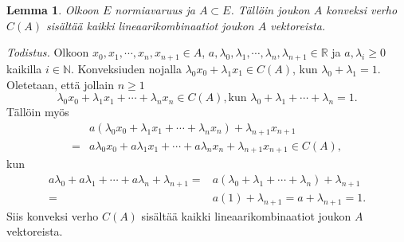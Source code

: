 \documentclass[12pt,a4paper,reqno]{amsart}
\newcommand{\R}{\mathbb{R}}
\newcommand{\N}{\mathbb{N}}
\newtheorem{lemma}[maar]{Lemma}
\begin{document}
\begin{lemma} \emph{Olkoon $E$ normiavaruus ja $A\subset E$. Tällöin joukon $A$ konveksi verho $C(A)$ sisältää kaikki lineaarikombinaatiot joukon $A$ vektoreista. }
\end{lemma}

\emph{Todistus.} 
Olkoon $x_0,x_1,\cdots, x_n, x_{n+1} \in A$, $a,\lambda_0,\lambda_1,\cdots, \lambda_n, \lambda_{n+1} \in \R$ ja $a,\lambda_i\geq 0$ kaikilla $ i\in\N$. Konveksiuden nojalla 
$\lambda_0 x_0+\lambda_1 x_1 \in C(A)$, kun $\lambda_0 +\lambda_1=1$.
Oletetaan, että jollain $n\geq 1$ 
\begin{equation*}
\lambda_0 x_0+\lambda_1 x_1+\cdots+\lambda_{n} x_{n}\in C(A), \text{kun } \lambda_0+\lambda_1+\cdots+ \lambda_{n} =1.
 \end{equation*}
Tällöin myös
\begin{equation*}
\begin{split}
&a(\lambda_0 x_0+\lambda_1 x_1+\cdots+\lambda_{n}x_n)+\lambda_{n+1} x_{n+1}\\=&a\lambda_0 x_0+a\lambda_1 x_1+\cdots+a\lambda_{n}x_n+\lambda_{n+1} x_{n+1}
\in C(A),
\end{split}
\end{equation*}
kun 
\begin{equation*}
\begin{split}
a\lambda_0+a\lambda_1+\cdots+ a\lambda_{n}+ \lambda_{n+1}=&a(\lambda_0+\lambda_1+\cdots+ \lambda_{n})+ \lambda_{n+1}\\=&a(1)+ \lambda_{n+1}=a+ \lambda_{n+1}=1.
\end{split}
\end{equation*} 
Siis konveksi verho $C(A)$ sisältää kaikki lineaarikombinaatiot joukon $A$ vektoreista.
\end{document}
